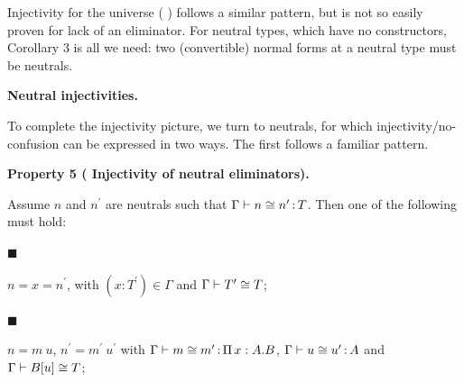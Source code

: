  
 
Injectivity for the universe ( ) follows a similar pattern, but is not so easily proven for lack of an eliminator. For neutral types, which have no constructors, Corollary 3 is all we need: two (convertible) normal forms at a neutral type must be neutrals.\par
 
 
 
 
\par\medskip\noindent\textbf{Neutral injectivities.}\par
 
 
To complete the injectivity picture, we turn to neutrals, for which injectivity/no-confusion can be expressed in two ways. The first follows a familiar pattern.\par
 
 
 
\par\medskip\noindent\textbf{Property 5 (  Injectivity of neutral eliminators).}\par
 
 
Assume $n$ and $n^{\prime}$ are neutrals such that $\Gamma\vdash n\mathrel{\raisebox{-0.5pt}{$\cong$}}n^{\prime}\operatorname{%
\mathrel{:}}T$. Then one of the following must hold:\par
  
\par\noindent  $\blacksquare$ 
 
$n=x=n^{\prime}$, with $(x:T^{\prime})\in\Gamma$ and $\Gamma\vdash T^{\prime}\mathrel{\raisebox{-0.5pt}{$\cong$}}T$;\par
 
 
 
\par\noindent  $\blacksquare$ 
 
$n=m\ u$, $n^{\prime}=m^{\prime}\ u^{\prime}$ with $\Gamma\vdash m\mathrel{\raisebox{-0.5pt}{$\cong$}}m^{\prime}\operatorname{%
\mathrel{:}}\operatorname{\Pi}x:A.B$, $\Gamma\vdash u\mathrel{\raisebox{-0.5pt}{$\cong$}}u^{\prime}\operatorname{%
\mathrel{:}}A$ and $\Gamma\vdash B\mathord{\left[u\right]}\mathrel{\raisebox{-0.5pt}{$\cong$}}T$;\par
 
